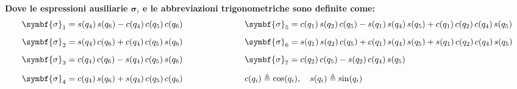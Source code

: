 \documentclass[11pt, a4paper]{article}
\newcommand{\sigone}{\symbf{\sigma}_1}
\newcommand{\sigtwo}{\symbf{\sigma}_2}
\newcommand{\sigthree}{\symbf{\sigma}_3}
\newcommand{\sigfour}{\symbf{\sigma}_4}
\newcommand{\sigfive}{\symbf{\sigma}_5}
\newcommand{\sigsix}{\symbf{\sigma}_6}
\newcommand{\sigseven}{\symbf{\sigma}_7}
\begin{document}
\begin{lrbox}{\rotpagebox}
\begin{minipage}[t][\textwidth][t]{\textheight}
\vspace{12pt}
\noindent\textbf{Dove le espressioni ausiliarie $\symbf{\sigma}_i$ e le abbreviazioni trigonometriche sono definite come:}
\[
\begin{aligned}
\sigone   &= s(q_4)\,s(q_6) - c(q_4)\,c(q_5)\,c(q_6) &\hspace{2.2cm} \sigfive  &= c(q_1)\,s(q_2)\,c(q_5) - s(q_1)\,s(q_4)\,s(q_5) + c(q_1)\,c(q_2)\,c(q_4)\,s(q_5) \\[6pt]
\sigtwo   &= s(q_4)\,c(q_6) + c(q_4)\,c(q_5)\,s(q_6) &\hspace{2.2cm} \sigsix   &= s(q_1)\,s(q_2)\,c(q_5) + c(q_1)\,s(q_4)\,s(q_5) + s(q_1)\,c(q_2)\,c(q_4)\,s(q_5) \\[6pt]
\sigthree &= c(q_4)\,c(q_6) - s(q_4)\,c(q_5)\,s(q_6) &\hspace{2.2cm} \sigseven &= c(q_2)\,c(q_5) - s(q_2)\,c(q_4)\,s(q_5) \\[6pt]
\sigfour  &= c(q_4)\,s(q_6) + s(q_4)\,c(q_5)\,c(q_6) &\hspace{2.2cm} \mathrlap{c(q_i) \triangleq \cos(q_i), \quad s(q_i) \triangleq \sin(q_i)}\phantom{\sigseven} &
\end{aligned}
\]
\end{minipage}
\end{lrbox}
\noindent{}
\end{document}

